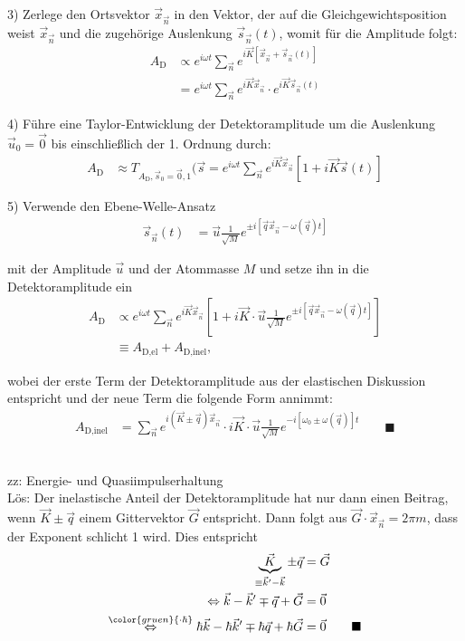 \documentclass{article}
\newcommand{\lreck}[1]{\left[#1\right]}
\newcommand{\comment}[1]{{\color{gruen}{#1}}}
\begin{document}
{	3) Zerlege den Ortsvektor $\vec{x}_{\vec{n}}$ in den Vektor, der auf die Gleichgewichtsposition weist $\vec{x}_{\vec{n}}$ und die zugehörige Auslenkung $\vec{s}_{\vec{n}}(t)$, womit für die Amplitude folgt:
		\begin{align*}
			A_\text{D} &\propto e^{i\omega t} \sum_{\vec{n}} e^{i\vec{K} [\vec{x}_{\vec{n}} + \vec{s}_{\vec{n}}(t)]} \\
			&= e^{i\omega t} \sum_{\vec{n}} e^{i\vec{K} \vec{x}_{\vec{n}}} \cdot e^{i\vec{K} \vec{s}_{\vec{n}}(t)}
		\end{align*}
	
	4) Führe eine Taylor-Entwicklung der Detektoramplitude um die Auslenkung $\vec{u}_0 = \vec{0}$ bis einschließlich der 1. Ordnung durch:
		\begin{align*}
			A_\text{D} &\approx T_{A_\text{D},\vec{s}_0=\vec{0},1}(\vec{s} = e^{i\omega t} \sum_{\vec{n}} e^{i\vec{K}\vec{x}_{\vec{n}}} \lreck{ 1 + i \vec{K} \vec{s}(t) }
		\end{align*}
	
	5) Verwende den Ebene-Welle-Ansatz
		\begin{align*}
			\vec{s}_{\vec{n}}(t) &= \vec{u} \frac{1}{\sqrt{M}} e^{\pm i \lreck{ \vec{q} \vec{x}_{\vec{n}} - \omega(\vec{q}) t }}
		\end{align*}
	
	mit der Amplitude $\vec{u}$ und der Atommasse $M$ und setze ihn in die Detektoramplitude ein
		\begin{align*}
			A_\text{D} &\propto e^{i\omega t} \sum_{\vec{n}} e^{i\vec{K}\vec{x}_{\vec{n}}} \lreck{ 1 + i \vec{K} \cdot \vec{u} \frac{1}{\sqrt{M}} e^{\pm i \lreck{ \vec{q} \vec{x}_{\vec{n}} - \omega(\vec{q}) t }} } \\
			&\equiv A_\text{D,el} + A_\text{D,inel},
		\end{align*}
	
	wobei der erste Term der Detektoramplitude aus der elastischen Diskussion entspricht und der neue Term die folgende Form annimmt:
		\begin{align*}
			A_\text{D,inel} &= \sum_{\vec{n}} e^{i (\vec{K} \pm \vec{q})\vec{x}_{\vec{n}}} \cdot i\vec{K} \cdot \vec{u} \frac{1}{\sqrt{M}} e^{-i \lreck{ \omega_0 \pm \omega(\vec{q}) } t } \qquad \blacksquare
		\end{align*}
	
	
	\\
	zz: Energie- und Quasiimpulserhaltung\\
	Lös: Der inelastische Anteil der Detektoramplitude hat nur dann einen Beitrag, wenn $\vec{K} \pm \vec{q}$ einem Gittervektor $\vec{G}$ entspricht. Dann folgt aus $\vec{G} \cdot \vec{x}_{\vec{n}} = 2\pi m$, dass der Exponent schlicht 1 wird. Dies entspricht
		\begin{align*}
			\underbrace{\vec{K}}_{\equiv \vec{k}' - \vec{k}} \pm \vec{q} &= \vec{G} \\
			\Leftrightarrow \vec{k} - \vec{k}' \mp \vec{q} + \vec{G} &= \vec{0} \\
			\stackrel{ \comment{\cdot \hbar} }{\Leftrightarrow} \hbar \vec{k} - \hbar \vec{k}' \mp \hbar \vec{q} + \hbar \vec{G} &= \vec{0} \qquad \blacksquare
		\end{align*}
	
}
\end{document}
